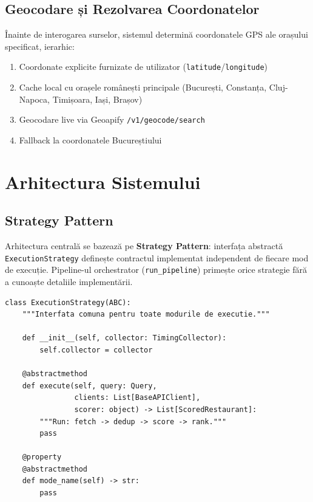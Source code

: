 \documentclass[12pt,a4paper]{article}
\begin{document}
\subsection{Geocodare și Rezolvarea Coordonatelor}

Înainte de interogarea surselor, sistemul determină coordonatele GPS ale orașului specificat, ierarhic:

\begin{enumerate}[noitemsep]
  \item Coordonate explicite furnizate de utilizator (\texttt{latitude}/\texttt{longitude})
  \item Cache local cu orașele românești principale (București, Constanța, Cluj-Napoca, Timișoara, Iași, Brașov)
  \item Geocodare live via Geoapify \texttt{/v1/geocode/search}
  \item Fallback la coordonatele Bucureștiului
\end{enumerate}

\section{Arhitectura Sistemului}

\subsection{Strategy Pattern}

Arhitectura centrală se bazează pe \textbf{Strategy Pattern}: interfața abstractă \texttt{ExecutionStrategy} definește contractul implementat independent de fiecare mod de execuție. Pipeline-ul orchestrator (\texttt{run\_pipeline}) primește orice strategie fără a cunoaște detaliile implementării.

\begin{lstlisting}[caption={Interfața abstractă ExecutionStrategy (execution/base.py)}]
class ExecutionStrategy(ABC):
    """Interfata comuna pentru toate modurile de executie."""

    def __init__(self, collector: TimingCollector):
        self.collector = collector

    @abstractmethod
    def execute(self, query: Query,
                clients: List[BaseAPIClient],
                scorer: object) -> List[ScoredRestaurant]:
        """Run: fetch -> dedup -> score -> rank."""
        pass

    @property
    @abstractmethod
    def mode_name(self) -> str:
        pass
\end{lstlisting}
\end{document}
